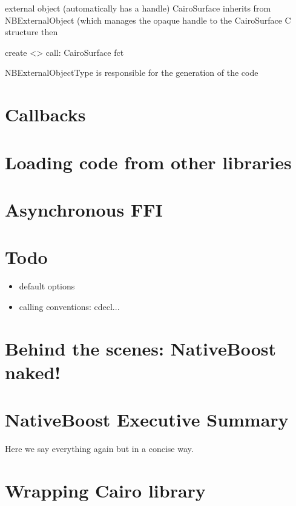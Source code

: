 \documentclass[a4paper,10pt,twoside]{book}
\begin{document}
external object (automatically has a handle)
CairoSurface inherits from NBExternalObject (which manages the opaque handle to the CairoSurface C structure then 

\begin{code}{}
create  
	<>
	call: CairoSurface	fct 
\end{code}	

NBExternalObjectType is responsible for the generation of the code


\section{Callbacks}


\section{Loading code from other libraries}


\section{Asynchronous FFI}


\section{Todo}

\begin{itemize}
\item default options 
\item calling conventions: cdecl...
\end{itemize}


\section{Behind the scenes: NativeBoost naked!}

\section{NativeBoost Executive Summary}

Here we say everything again but in a concise way. 

\section{Wrapping Cairo library}
\end{document}
